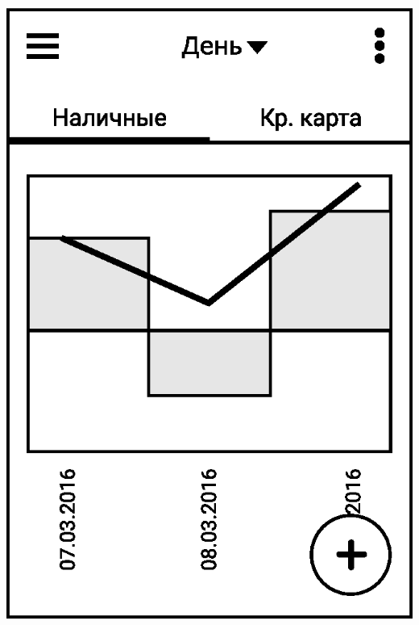 \documentclass[russian,utf8,a1paper,nostitching,simple]{eskdgraph}
\begin{document}
\begin{ESKDdrawing}
\begin{minipage}{28cm}
\begin{minipage}{7.5cm}
      \centering
      \includegraphics[width=\linewidth]{fig/ui_activities_balance_graphic_chrono.eps}


\end{minipage}
\end{minipage}
\end{ESKDdrawing}
\end{document}
